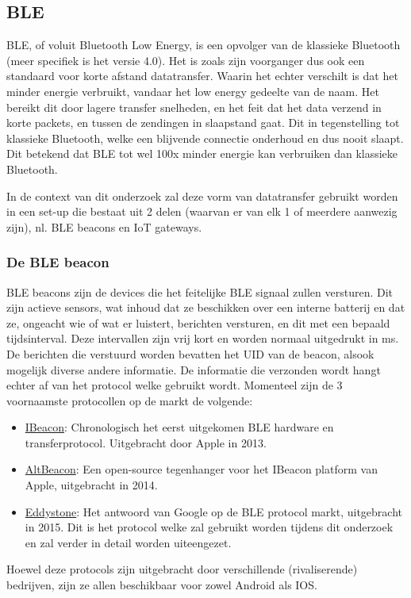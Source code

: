 \subsection{BLE}
\label{subsec:lit-ble}
BLE, of voluit Bluetooth Low Energy, is een opvolger van de klassieke Bluetooth (meer specifiek is het versie 4.0). Het is zoals zijn voorganger dus ook een standaard voor korte afstand datatransfer. Waarin het echter verschilt is dat het minder energie verbruikt, vandaar het low energy gedeelte van de naam. Het bereikt dit door lagere transfer snelheden, en het feit dat het data verzend in korte packets, en tussen de zendingen in slaapstand gaat. Dit in tegenstelling tot klassieke Bluetooth, welke een blijvende connectie onderhoud en dus nooit slaapt. Dit betekend dat BLE tot wel 100x minder energie kan verbruiken dan klassieke Bluetooth. \autocite{Nesbo2021}

In de context van dit onderzoek zal deze vorm van datatransfer gebruikt worden in een set-up die bestaat uit 2 delen (waarvan er van elk 1 of meerdere aanwezig zijn), nl. BLE beacons en IoT gateways.

\subsubsection{De BLE beacon}
BLE beacons zijn de devices die het feitelijke BLE signaal zullen versturen. Dit zijn actieve sensors, wat inhoud dat ze beschikken over een interne batterij en dat ze, ongeacht wie of wat er luistert, berichten versturen, en dit met een bepaald tijdsinterval. Deze intervallen zijn vrij kort en worden normaal uitgedrukt in ms.\autocite{Adarsh2022}
De berichten die verstuurd worden bevatten het UID van de beacon, alsook mogelijk diverse andere informatie. De informatie die verzonden wordt hangt echter af van het protocol welke gebruikt wordt. Momenteel zijn de 3 voornaamste protocollen op de markt de volgende:
\begin{itemize}
	\item \underline{IBeacon}:
	Chronologisch het eerst uitgekomen BLE hardware en transferprotocol. Uitgebracht door Apple in 2013. 
	\item \underline{AltBeacon}:
	Een open-source tegenhanger voor het IBeacon platform van Apple, uitgebracht in 2014.
	\item \underline{Eddystone}:
	Het antwoord van Google op de BLE protocol markt, uitgebracht in 2015. Dit is het protocol welke zal gebruikt worden tijdens dit onderzoek en zal verder in detail worden uiteengezet.
\end{itemize}
Hoewel deze protocols zijn uitgebracht door verschillende (rivaliserende) bedrijven, zijn ze allen beschikbaar voor zowel Android als IOS.\autocite{Smart2022}

